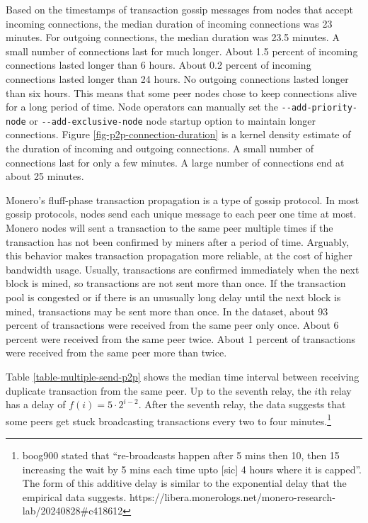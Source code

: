 \documentclass[usletter,11pt,english,openany]{article}
\begin{document}
Based on the timestamps of transaction gossip messages from nodes
that accept incoming connections, the median duration of incoming
connections was 23 minutes. For outgoing connections, the median duration
was 23.5 minutes. A small number of connections last for much longer.
About 1.5 percent of incoming connections lasted longer than 6 hours.
About 0.2 percent of incoming connections lasted longer than 24 hours.
No outgoing connections lasted longer than six hours. This means that
some peer nodes chose to keep connections alive for a long period
of time. Node operators can manually set the \texttt{-{}-add-priority-node}
or \texttt{-{}-add-exclusive-node} node startup option to maintain
longer connections. Figure \ref{fig-p2p-connection-duration} is a
kernel density estimate of the duration of incoming and outgoing connections.
A small number of connections last for only a few minutes. A large
number of connections end at about 25 minutes.

Monero's fluff-phase transaction propagation is a type of gossip protocol.
In most gossip protocols, nodes send each unique message to each peer
one time at most. Monero nodes will sent a transaction to the same
peer multiple times if the transaction has not been confirmed by miners
after a period of time. Arguably, this behavior makes transaction
propagation more reliable, at the cost of higher bandwidth usage.
Usually, transactions are confirmed immediately when the next block
is mined, so transactions are not sent more than once. If the transaction
pool is congested or if there is an unusually long delay until the
next block is mined, transactions may be sent more than once. In the
dataset, about 93 percent of transactions were received from the same
peer only once. About 6 percent were received from the same peer twice.
About 1 percent of transactions were received from the same peer more
than twice.

Table \ref{table-multiple-send-p2p} shows the median time interval
between receiving duplicate transaction from the same peer. Up to
the seventh relay, the $i$th relay has a delay of $f(i)=5\cdot2^{i-2}$.
After the seventh relay, the data suggests that some peers get stuck
broadcasting transactions every two to four minutes.\footnote{boog900 stated that ``re-broadcasts happen after 5 mins then 10,
then 15 increasing the wait by 5 mins each time upto {[}sic{]} 4 hours
where it is capped''. The form of this additive delay is similar
to the exponential delay that the empirical data suggests. https://libera.monerologs.net/monero-research-lab/20240828\#c418612} 
\end{document}
